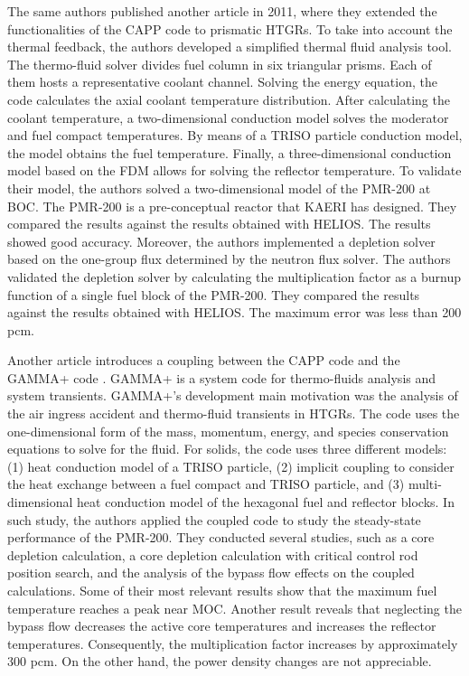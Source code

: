 \documentclass[11pt,letterpaper]{article}
\begin{document}
The same authors published another article \cite{lee_development_2011} in 2011, where they extended the functionalities of the CAPP code to prismatic \glspl{HTGR}.
To take into account the thermal feedback, the authors developed a simplified thermal fluid analysis tool.
The thermo-fluid solver divides fuel column in six triangular prisms.
Each of them hosts a representative coolant channel.
Solving the energy equation, the code calculates the axial coolant temperature distribution.
After calculating the coolant temperature, a two-dimensional conduction model solves the moderator and fuel compact temperatures.
By means of a TRISO particle conduction model, the model obtains the fuel temperature.
Finally, a three-dimensional conduction model based on the \gls{FDM} allows for solving the reflector temperature.
To validate their model, the authors solved a two-dimensional model of the PMR-200 at \gls{BOC}.
The PMR-200 is a pre-conceptual reactor that \gls{KAERI} has designed.
They compared the results against the results obtained with HELIOS.
The results showed good accuracy.
Moreover, the authors implemented a depletion solver based on the one-group flux determined by the neutron flux solver.
The authors validated the depletion solver by calculating the multiplication factor as a burnup function of a single fuel block of the PMR-200.
They compared the results against the results obtained with HELIOS.
The maximum error was less than 200 pcm.

Another article \cite{tak_cappgamma_2016} introduces a coupling between the CAPP code and the GAMMA+ code \cite{lim_gamma_2006}.
GAMMA+ is a system code for thermo-fluids analysis and system transients.
GAMMA+'s development main motivation was the analysis of the air ingress accident and thermo-fluid transients in \glspl{HTGR}.
The code uses the one-dimensional form of the mass, momentum, energy, and species conservation equations to solve for the fluid.
For solids, the code uses three different models: (1) heat conduction model of a TRISO particle, (2) implicit coupling to consider the heat exchange between a fuel compact and TRISO particle, and (3) multi-dimensional heat conduction model of the hexagonal fuel and reflector blocks.
In such study, the authors applied the coupled code to study the steady-state performance of the PMR-200.
They conducted several studies, such as a core depletion calculation, a core depletion calculation with critical control rod position search, and the analysis of the bypass flow effects on the coupled calculations.
Some of their most relevant results show that the maximum fuel temperature reaches a peak near MOC.
Another result reveals that neglecting the bypass flow decreases the active core temperatures and increases the reflector temperatures.
Consequently, the multiplication factor increases by approximately 300 pcm.
On the other hand, the power density changes are not appreciable.
\end{document}

